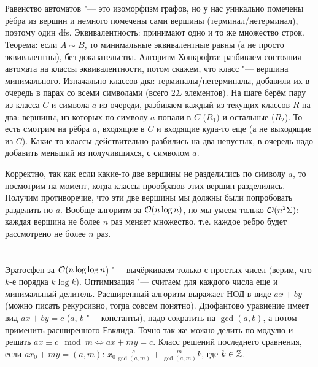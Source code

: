 \section{} %
Равенство автоматов "--- это изоморфизм графов, но у нас уникально помечены рёбра из вершин и немного помечены сами вершины (терминал/нетерминал), поэтому один dfs.
Эквивалентность: принимают одно и то же множество строк.
Теорема: если $A \sim B$, то минимальные эквивалентные равны (а не просто эквивалентны), без доказательства.
Алгоритм Хопкрофта: разбиваем состояния автомата на классы эквивалентности, потом скажем, что класс "--- вершина минимального.
Изначально классов два: терминалы/нетерминалы, добавили их в очередь в парах со всеми символами (всего $2\Sigma$ элементов).
На шаге берём пару из класса $C$ и символа $a$ из очереди, разбиваем каждый из текущих классов $R$ на два: вершины, из которых по символу $a$ попали в $C$ ($R_1)$ и остальные ($R_2$).
То есть смотрим на рёбра $a$, входящие в $C$ и входящие куда-то еще (а не выходящие из $C$).
Какие-то классы действительно разбились на два непустых, в очередь надо добавить меньший из получившихся, с символом $a$.

Корректно, так как если какие-то две вершины не разделились по символу $a$, то посмотрим на момент, когда классы прообразов этих вершин разделились.
Получим противоречие, что эти две вершины мы должны были попробовать разделить по $a$.
Вообще алгоритм за $\mathcal{O}(n \log n)$, но мы умеем только $\mathcal{O}(n^2\Sigma)$: каждая вершина не более $n$ раз меняет множество, т.е. каждое ребро будет рассмотрено не более $n$ раз.

\section{} %
\TODO

\section{} %
\TODO

\section{} %
\TODO

\section{} %
Эратосфен за $\mathcal{O}(n \log \log n$) "--- вычёркиваем только с простых чисел (верим, что $k$-е порядка $k \log k$).
Оптимизация "--- считаем для каждого числа еще и минимальный делитель.
Расширенный алгоритм выражает НОД в виде $ax+by$ (можно писать рекурсивно, тогда совсем понятно).
Диофантово уравнение имеет вид $ax+by=c$ ($a$, $b$ "--- константы), надо сократить на $\gcd(a, b)$, а потом применить расширенного Евклида.
Точно так же можно делить по модулю и решать $ax\equiv c \mod m \iff ax+my = c$.
Класс решений последнего сравнения, если $ax_0 + my = (a, m)$: $x_0 \frac{c}{\gcd(a, m)} + \frac{m}{\gcd(a, m)}k$, где $k \in \mathbb{Z}$.

